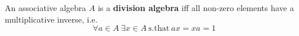 \begin{definition}\label{d:division-algebra}
	An associative algebra $A$ is a \textbf{division algebra} iff all non-zero elements have a multiplicative inverse, i.e.
	\[\forall a \in A \ \exists x \in A \ \mathrm{s. that} \ ax = xa = 1\]
\end{definition}
